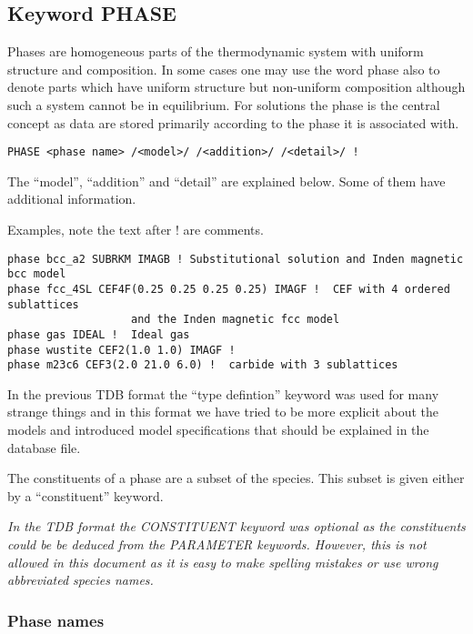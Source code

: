 \documentclass[12pt]{article}
\begin{document}
\subsection{Keyword PHASE}

Phases are homogeneous parts of the thermodynamic system with uniform
structure and composition.  In some cases one may use the word phase
also to denote parts which have uniform structure but non-uniform
composition although such a system cannot be in equilibrium.  For
solutions the phase is the central concept as data are stored
primarily according to the phase it is associated with.

\begin{verbatim}
PHASE <phase name> /<model>/ /<addition>/ /<detail>/ !
\end{verbatim}

The ``model'', ``addition'' and ``detail'' are explained below.  Some
of them have additional information.

Examples, note the text after ! are comments.

\begin{verbatim}
phase bcc_a2 SUBRKM IMAGB ! Substitutional solution and Inden magnetic bcc model
phase fcc_4SL CEF4F(0.25 0.25 0.25 0.25) IMAGF !  CEF with 4 ordered sublattices
                   and the Inden magnetic fcc model
phase gas IDEAL !  Ideal gas
phase wustite CEF2(1.0 1.0) IMAGF ! 
phase m23c6 CEF3(2.0 21.0 6.0) !  carbide with 3 sublattices
\end{verbatim}

In the previous TDB format the ``type defintion'' keyword was used for
many strange things and in this format we have tried to be more
explicit about the models and introduced model specifications that
should be explained in the database file.

The constituents of a phase are a subset of the species.  This subset
is given either by a ``constituent'' keyword.

{\em In the TDB format the CONSTITUENT keyword was optional as the
  constituents could be be deduced from the PARAMETER keywords.
  However, this is not allowed in this document as it is easy to make
  spelling mistakes or use wrong abbreviated species names.}

\subsubsection{Phase names}\label{sec:phnames}
\end{document}
